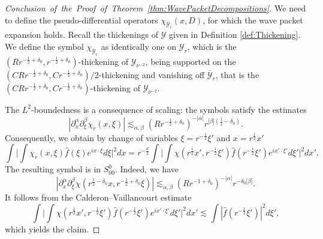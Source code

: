 \documentclass{amsart}
\theoremstyle{definition}
\begin{document}
\begin{proof}[Conclusion~of~the~Proof~of~Theorem~\ref{thm:WavePacketDecompositions}]
    We need to define the pseudo-differential operators $\chi_{\overline{\mathcal{Y}}_r}(x,D)$, for which the wave packet expansion holds. Recall the thickenings of $\mathcal{Y}$ given in Definition \ref{def:Thickening}. We define the symbol $\chi_{\overline{\mathcal{Y}}_r}$ as identically one on $\mathcal{Y}_{r}$, which is the $(R r^{-\frac12 + \delta_0},r^{-\frac12 + \delta_0})$-thickening of $\mathcal{Y}_{\nu^{-2}}$, being supported on the $(C R r^{-\frac12 + \delta_0},Cr^{-\frac12 + \delta_0})/2$-thickening and vanishing off $\overline{\mathcal{Y}}_{r}$, that is the \\ $(C R r^{-\frac12 + \delta_0},C r^{-\frac12 + \delta_0})$-thickening of $\mathcal{Y}_{\nu^{-2}}$. 

    The $L^2$-boundedness is a consequence of scaling: the symbols satisfy the estimates
    \begin{equation*}
        |\partial_x^{\alpha} \partial_{\xi}^{\beta} \chi_r(x,\xi)| \lesssim_{\alpha,\beta} (R r^{-\frac{1}{2}+\delta_0})^{-|\alpha|} r^{|\beta| (\frac{1}{2}-\delta_0)}.
    \end{equation*}
    Consequently, we obtain by change of variables $\xi = r^{-\frac{1}{2}} \xi'$ and $x = r^{\frac{1}{2}} x'$
    \begin{equation*}
        \int \big| \int \chi_r(x,\xi) \hat{f}(\xi) e^{i x \cdot \xi} d \xi \big|^2 dx = r^{-\frac{d}{2}} \int \big| \int \chi( r^{\frac{1}{2}} x', r^{-\frac{1}{2}} \xi') \hat{f}(r^{-\frac{1}{2}} \xi') e^{i x' \cdot \xi'} d\xi' \big|^2 dx'.
    \end{equation*}
    The resulting symbol is in $S_{00}^0$. Indeed, we have
    \begin{equation*}
        | \partial_x^{\alpha} \partial_{\xi}^{\beta} \chi( r^{\frac{1}{2}-\delta_0} x, r^{-\frac{1}{2}+\delta_0} \xi)| \lesssim_{\alpha,\beta} (R r^{-1+\delta_0})^{-|\alpha|} r^{-\delta_0 |\beta|}.
    \end{equation*}
    It follows from  the Calderon--Vaillancourt estimate
    \begin{equation*}
        \int \big| \int \chi( r^{\frac{1}{2}} x', r^{-\frac{1}{2}} \xi') \hat{f}(r^{-\frac{1}{2}} \xi') e^{i x' \cdot \xi'} d\xi' \big|^2 dx' \lesssim \int |\hat{f}(r^{-\frac{1}{2}} \xi')|^2 d\xi',
    \end{equation*}
    which yields the claim.


\end{proof}
\end{document}
